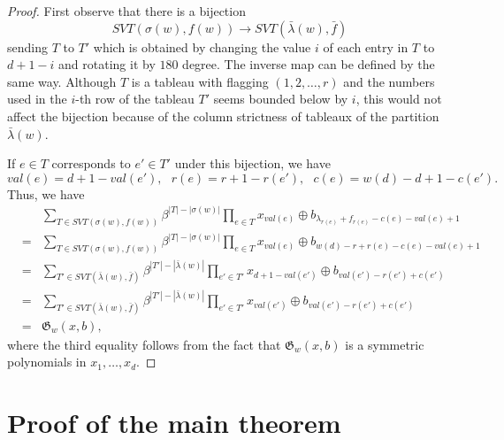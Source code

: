\documentclass[11pt,reqno,sumlimits]{amsart}
\newcommand{\frakG}{{\mathfrak G}}
\newcommand{\FSVT}{{SVT}}
\theoremstyle{definition}
\numberwithin{equation}{section}
\begin{document}
\begin{proof}
First observe that there is a bijection 
\[
\FSVT(\sigma(w),f(w)) \to \FSVT(\bar \lambda(w), \bar f)
\]
sending $T$ to $T'$ which is obtained by changing the value $i$ of each entry in $T$ to $d+1-i$ and rotating it by $180$ degree. The inverse map can be defined by the same way. Although $T$ is a tableau with flagging $(1,2,\dots, r)$ and the numbers used in the $i$-th row of the tableau $T'$ seems bounded below by $i$,  this would not affect the bijection because of the column strictness of tableaux of the partition $\bar \lambda(w)$. 

If $e\in T$ corresponds to $e'\in T'$ under this bijection, we have
\[
val(e)= d+1-val(e'), \ \ \  r(e) = r+1-r(e'), \ \ \ c(e) = w(d)-d+1-c(e').
\]
Thus, we have
\begin{eqnarray*}
&&\sum_{T\in \FSVT(\sigma(w),f(w))} \beta^{|T|-|\sigma(w)|} \prod_{e\in T} x_{val(e)} \oplus b_{\lambda_{r(e)} + f_{r(e)} - c(e) - val(e) +1}\\
&=&\sum_{T\in \FSVT(\sigma(w),f(w))} \beta^{|T|-|\sigma(w)|} \prod_{e\in T} x_{val(e)} \oplus b_{w(d)-r +r(e) - c(e) - val(e) +1}\\
&=&\sum_{T'\in \FSVT(\bar \lambda(w), \bar f)} \beta^{|T'|-|\bar \lambda(w)|} \prod_{e'\in T'} x_{d+1-val(e')} \oplus b_{val(e')-r(e')+c(e')}\\
&=&\sum_{T'\in \FSVT(\bar \lambda(w), \bar f)} \beta^{|T'|-|\bar \lambda(w)|} \prod_{e'\in T'} x_{val(e')} \oplus b_{val(e')-r(e')+c(e')}\\
&=&\frakG_w(x,b),
\end{eqnarray*}
where the third equality follows from the fact that $\frakG_w(x,b)$ is a symmetric polynomials in $x_1,\dots, x_d$.
\end{proof}
\section{Proof of the main theorem}\label{S3}
\end{document}
